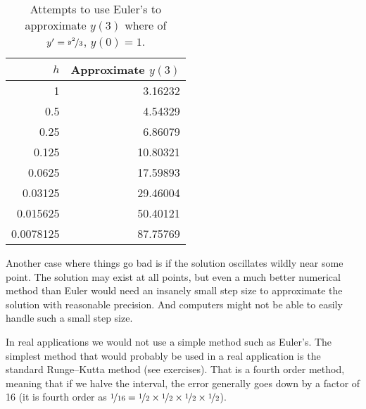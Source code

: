 \documentclass{ximera}
\begin{document}
\begin{table}[h!t]
    \mybeginframe
    \capstart
    \begin{center}
        \begin{tabular}{@{}rr@{}}
            \toprule
            $h$ & Approximate $y(3)$ \\
            \midrule
            1        & 3.16232 \\
            0.5      & 4.54329 \\
            0.25     & 6.86079 \\
            0.125    & 10.80321 \\
            0.0625   & 17.59893 \\
            0.03125  & 29.46004 \\
            0.015625 & 50.40121 \\
            0.0078125& 87.75769 \\
            \bottomrule
        \end{tabular}
    \end{center}
    \caption{Attempts to use Euler's to approximate $y(3)$ where of $y'=\nicefrac{y^2}{3}$, $y(0)=1$.\label{euler-table2:table}}
    \myendframe
\end{table}

Another case where things go bad is if the solution oscillates wildly near some point.
The solution may exist at all points, but even a much better numerical method than Euler would need an insanely small step size to approximate the solution with reasonable precision. And computers might not be able to easily handle such a small step size.

\medskip

In real applications we would not use a simple method such as Euler's.  The simplest method that would probably be used in a real application is the standard Runge--Kutta method (see exercises).  That is a fourth order method, meaning that if we halve the interval, the error generally goes down by a factor of 16 (it is fourth order as $\nicefrac{1}{16} = \nicefrac{1}{2} \times \nicefrac{1}{2} \times \nicefrac{1}{2} \times \nicefrac{1}{2}$).
\end{document}
